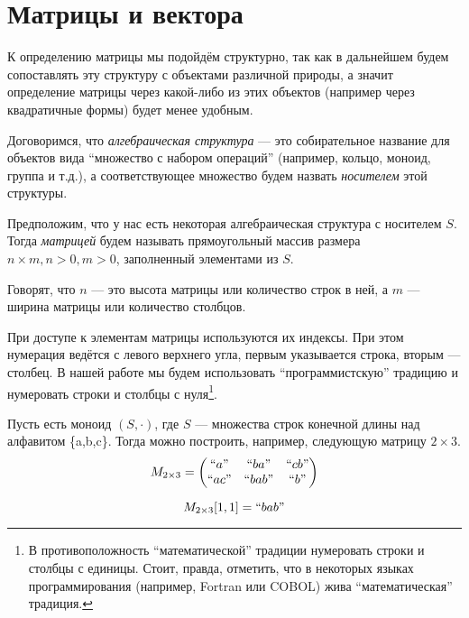 \section{Матрицы и вектора}

К определению матрицы мы подойдём структурно, так как в дальнейшем будем сопоставлять эту структуру с объектами различной природы, а значит определение матрицы через какой-либо из этих объектов (например через квадратичные формы) будет менее удобным.

Договоримся, что \textit{алгебраическая структура} --- это собирательное название для объектов вида ``множество с набором операций'' (например, кольцо, моноид, группа и т.д.), а соответствующее множество будем назвать \textit{носителем} этой структуры.

\begin{definition}

Предположим, что у нас есть некоторая алгебраическая структура с носителем $S$. Тогда \emph{матрицей} будем называть прямоугольный массив размера $n\times m, n > 0, m > 0$, заполненный элементами из $S$.

Говорят, что $n$ --- это высота матрицы или количество строк в ней, а $m$ --- ширина матрицы или количество столбцов.

\end{definition}

При доступе к элементам матрицы используются их индексы. При этом нумерация ведётся с левого верхнего угла, первым указывается строка, вторым --- столбец. В нашей работе мы будем использовать ``программистскую'' традицию и нумеровать строки и столбцы с нуля\footnote{В противоположность ``математической'' традиции нумеровать строки и столбцы с единицы. Стоит, правда, отметить, что в некоторых языках программирования (например, Fortran или COBOL) жива ``математическая'' традиция.}.

\begin{example}[Матрица]

Пусть есть моноид $(S,\cdot)$, где $S$ --- множества строк конечной длины над алфавитом \{a,b,c\}.
Тогда можно построить, например, следующую матрицу $2\times 3$.
$$
M_{2\times 3} =
\begin{pmatrix}
``a" & ``ba" & ``cb" \\
``ac" & ``bab" & ``b" \\
\end{pmatrix}
$$

$$
M_{2\times 3}[1,1] = ``bab"
$$

\end{example}

